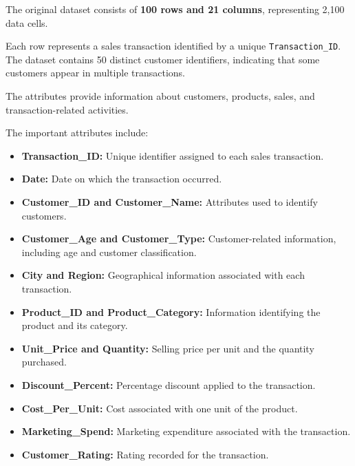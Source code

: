 \documentclass[12pt,a4paper]{report}
\begin{document}
The original dataset consists of
\textbf{100 rows and 21 columns},
representing 2,100 data cells.

Each row represents a sales transaction
identified by a unique
\texttt{Transaction\_ID}.
The dataset contains 50 distinct
customer identifiers, indicating that
some customers appear in multiple transactions.

The attributes provide information
about customers, products, sales,
and transaction-related activities.

The important attributes include:

\begin{itemize}

    \item \textbf{Transaction\_ID:}
    Unique identifier assigned to each
    sales transaction.

    \item \textbf{Date:}
    Date on which the transaction occurred.

    \item \textbf{Customer\_ID and Customer\_Name:}
    Attributes used to identify customers.

    \item \textbf{Customer\_Age and Customer\_Type:}
    Customer-related information, including
    age and customer classification.

    \item \textbf{City and Region:}
    Geographical information associated
    with each transaction.

    \item \textbf{Product\_ID and Product\_Category:}
    Information identifying the product
    and its category.

    \item \textbf{Unit\_Price and Quantity:}
    Selling price per unit and the
    quantity purchased.

    \item \textbf{Discount\_Percent:}
    Percentage discount applied
    to the transaction.

    \item \textbf{Cost\_Per\_Unit:}
    Cost associated with one unit
    of the product.

    \item \textbf{Marketing\_Spend:}
    Marketing expenditure associated
    with the transaction.

    \item \textbf{Customer\_Rating:}
    Rating recorded for the transaction.


\end{itemize}
\end{document}
